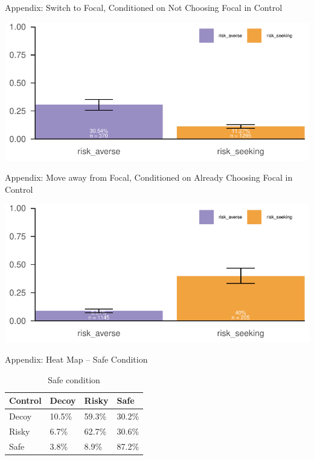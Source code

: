 \documentclass[
  ignorenonframetext,
  aspectratio=169]{beamer}
\begin{document}
\begin{frame}{Appendix: Switch to Focal, Conditioned on Not Choosing
Focal in Control}
\label{appendix-switch-to-focal-conditioned-on-not-choosing-focal-in-control}
\begin{flushright}\includegraphics{BE_Lab_1023_files/figure-beamer/unnamed-chunk-11-1} \end{flushright}
\end{frame}

\begin{frame}{Appendix: Move away from Focal, Conditioned on Already
Choosing Focal in Control}
\label{appendix-move-away-from-focal-conditioned-on-already-choosing-focal-in-control}
\begin{flushright}\includegraphics{BE_Lab_1023_files/figure-beamer/unnamed-chunk-12-1} \end{flushright}
\end{frame}

\begin{frame}{Appendix: Heat Map -- Safe Condition}
\label{appendix-heat-map-safe-condition}
\begin{table}
\centering
\caption{\label{tab:unnamed-chunk-13}Safe condition}
\centering
\begin{tabular}[t]{llll}
\toprule
Control & Decoy & Risky & Safe\\
\midrule
Decoy & 10.5\% & 59.3\% & 30.2\%\\
Risky & 6.7\% & 62.7\% & 30.6\%\\
Safe & 3.8\% & 8.9\% & 87.2\%\\
\bottomrule
\end{tabular}
\end{table}
\end{frame}
\end{document}
